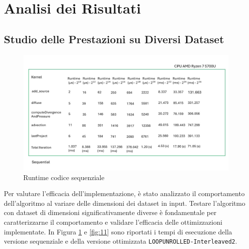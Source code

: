 \documentclass[12pt,a4paper,openany,twoside]{article}
\begin{document}

\section{Analisi dei Risultati}

\subsection{Studio delle Prestazioni su Diversi Dataset}

\begin{figure}
    \centering
    \includegraphics[width=0.75\linewidth]{figures/Slide11.jpg}
    \caption{Runtime codice sequenziale}
    \label{fig:10}
\end{figure}

Per valutare l'efficacia dell'implementazione, è stato analizzato il comportamento dell'algoritmo al variare delle dimensioni dei dataset in input. Testare l'algoritmo con dataset di dimensioni significativamente diverse è fondamentale per caratterizzarne il comportamento e validare l'efficacia delle ottimizzazioni implementate. In Figura \ref{fig:10} e \ref{fig:11} sono riportati i tempi di esecuzione della versione sequenziale e della versione ottimizzata \texttt{LOOPUNROLLED-Interleaved2}.
\end{document}
